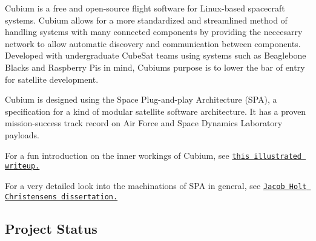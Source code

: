 Cubium is a free and open-\/source flight software for Linux-\/based spacecraft systems. Cubium allows for a more standardized and streamlined method of handling systems with many connected components by providing the neccesarry network to allow automatic discovery and communication between components. Developed with undergraduate Cube\+Sat teams using systems such as Beaglebone Blacks and Raspberry Pis in mind, Cubium\textquotesingle{}s purpose is to lower the bar of entry for satellite development.

Cubium is designed using the Space Plug-\/and-\/play Architecture (S\+PA), a specification for a kind of modular satellite software architecture. It has a proven mission-\/success track record on Air Force and Space Dynamics Laboratory payloads.

For a fun introduction on the inner workings of Cubium, see \href{https://drive.google.com/file/d/0ByiGNyJUAlpISUo5WDFwSkh3YU0/view?usp=sharing}{\tt this illustrated writeup.}

For a very detailed look into the machinations of S\+PA in general, see \href{http://digitalcommons.usu.edu/etd/1422/}{\tt Jacob Holt Christensen\textquotesingle{}s dissertation.}

\subsection*{Project Status}


